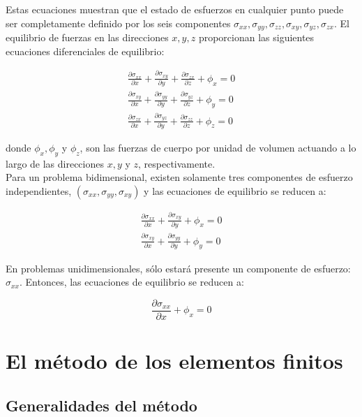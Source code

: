 Estas ecuaciones muestran que el estado de esfuerzos en cualquier punto puede ser completamente definido por 
los seis componentes $\sigma_{xx}, \sigma_{yy}, \sigma_{zz}, \sigma_{xy}, \sigma_{yz}, \sigma_{zx} $. 
El equilibrio de fuerzas en las direcciones $x,y,z$ proporcionan las siguientes ecuaciones diferenciales de 
equilibrio:

\begin{eqnarray}
\frac{\partial \sigma_{xx}}{\partial x} + \frac{\partial \sigma_{xy}}{\partial y} + 
\frac{\partial \sigma_{zx}}{\partial z} + \phi_{x} = 0 \nonumber \\
\frac{\partial \sigma_{xy}}{\partial x} + \frac{\partial \sigma_{yy}}{\partial y} + 
\frac{\partial \sigma_{yz}}{\partial z} + \phi_{y} = 0 \\
\frac{\partial \sigma_{zx}}{\partial x} + \frac{\partial \sigma_{yz}}{\partial y} + 
\frac{\partial \sigma_{zz}}{\partial z} + \phi_{z} = 0 \nonumber
\end{eqnarray}

donde $\phi_x, \phi_y$ y $\phi_z$, son las fuerzas de cuerpo por unidad de volumen actuando a lo largo 
de las direcciones $x,y$ y $z$, respectivamente.\\

Para un problema bidimensional, existen solamente tres componentes de esfuerzo independientes, 
$(\sigma_{xx},\sigma_{yy},\sigma_{xy})$ y las ecuaciones de equilibrio se reducen a:

\begin{eqnarray}
\frac{\partial \sigma_{xx}}{\partial x} + \frac{\partial \sigma_{xy}}{\partial y} + \phi_x = 0 \nonumber \\
\frac{\partial \sigma_{xy}}{\partial x} + \frac{\partial \sigma_{yy}}{\partial y} + \phi_y = 0 
\end{eqnarray}

En problemas unidimensionales, sólo estará presente un componente de esfuerzo: $\sigma_{xx}$. Entonces, 
las ecuaciones de equilibrio se reducen a:

\begin{equation}
\frac{\partial \sigma_{xx}}{\partial x} + \phi_x = 0
\end{equation}


\section{El método de los elementos finitos}

\subsection{Generalidades del método}

